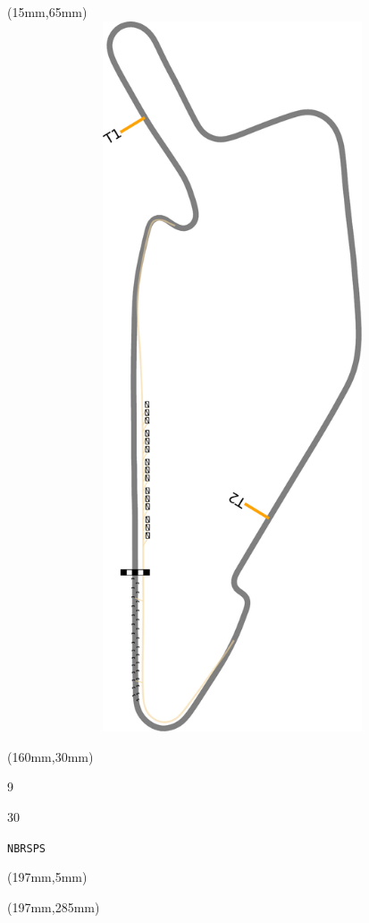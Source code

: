 \begin{textblock*}{185mm}(15mm,65mm)%
\centering
\mbox{\includegraphics[width=185mm,height=210mm,keepaspectratio]{PT/NBRSPS.pdf}}
\end{textblock*}
\begin{textblock*}{40mm}(160mm,30mm)%
\Large
\par{} 
\par9 
\par30 
\par\hfill\tiny\tt NBRSPS\\
\end{textblock*}
\begin{textblock*}{20mm}(197mm,5mm)%
\fbox{\thepage}
\label{NBRSPS}
\end{textblock*}
\begin{textblock*}{20mm}(197mm,285mm)%
\fbox{\thepage}
\end{textblock*}


